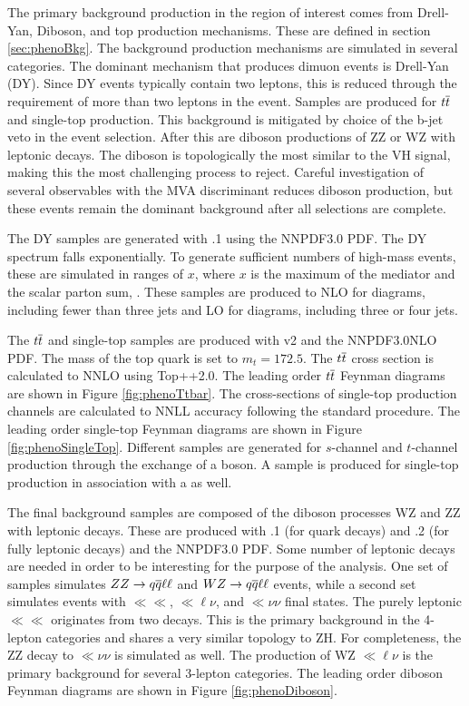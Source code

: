 The primary background production in the region of interest comes from Drell-Yan, Diboson, and top production mechanisms.
These are defined in section \ref{sec:phenoBkg}.
The background production mechanisms are simulated in several categories.
The dominant mechanism that produces dimuon events is Drell-Yan (DY). Since DY events typically contain two leptons, this is reduced through the requirement of more than two leptons in the event.
Samples are produced for $t\overline{t}$ and single-top production. This background is mitigated by choice of the b-jet veto in the event selection.
After this are diboson productions of ZZ or WZ with leptonic decays. The diboson is topologically the most similar to the VH signal, making this the most challenging process to reject.
Careful investigation of several observables with the MVA discriminant reduces diboson production, but these events remain the dominant background after all selections are complete.

The DY samples are generated with .1 using the NNPDF3.0 PDF. 
The DY \muu spectrum falls exponentially.
To generate sufficient numbers of high-mass events, these are simulated in ranges of $x$, where $x$ is the maximum of the mediator \pt and the scalar parton \pt sum, \httt.
These samples are produced to NLO for diagrams, including fewer than three jets and LO for diagrams, including three or four jets.

The $t\overline{t}$ and single-top samples are produced with \powheg v2 and the NNPDF3.0NLO PDF.
The mass of the top quark is set to $m_t=172.5$.
The $t\overline{t}$ cross section is calculated to NNLO using Top++2.0. \cite{Czakon:2011xx}
The leading order $t\overline{t}$ Feynman diagrams are shown in Figure \ref{fig:phenoTtbar}.
The cross-sections of single-top production channels are calculated to NNLL accuracy following the standard procedure. \cite{Kidonakis:2011wy, Kidonakis:2010ux}
The leading order single-top Feynman diagrams are shown in Figure \ref{fig:phenoSingleTop}.
Different samples are generated for $s$-channel and $t$-channel production through the exchange of a \W boson. A sample is produced for single-top production in association with a \W as well.

The final background samples are composed of the diboson processes WZ and ZZ with leptonic decays.
These are produced with .1 (for quark decays) and .2 (for fully leptonic decays) and the NNPDF3.0 PDF.
Some number of leptonic decays are needed in order to be interesting for the purpose of the analysis.
One set of samples simulates $ZZ\to q\overline{q}\ell\ell$ and $WZ\to q\overline{q}\ell\ell$ events, while a second set simulates events with $\ll\ll$, $\ll\ell\nu$, and $\ll\nu\nu$ final states. \cite{ATL-PHYS-PUB-2017-005}
The purely leptonic $\ll\ll$ originates from two \Z decays.
This is the primary background in the 4-lepton categories and shares a very similar topology to ZH.
For completeness, the ZZ decay to $\ll\nu\nu$ is simulated as well.
The production of WZ $\ll\ell\nu$ is the primary background for several 3-lepton categories.
The leading order diboson Feynman diagrams are shown in Figure \ref{fig:phenoDiboson}.

